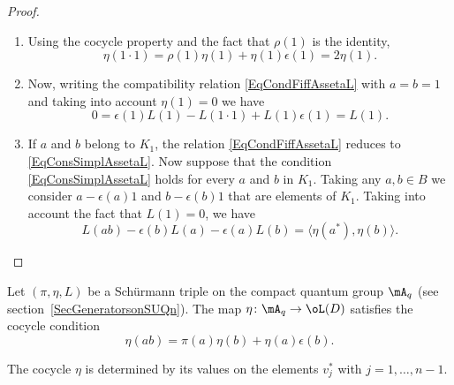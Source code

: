 \begin{proof}
    \begin{enumerate}
        \item
            Using the cocycle property and the fact that $\rho(1)$ is the identity,
            \begin{equation}
                \eta(1\cdot 1)=\rho(1)\eta(1)+\eta(1)\epsilon(1)=2\eta(1).
            \end{equation}
        \item
            Now, writing the compatibility relation \eqref{EqCondFiffAssetaL} with $a=b=1$ and taking into account $\eta(1)=0$ we have
            \begin{equation}
                0=\epsilon(1)L(1)-L(1\cdot 1)+L(1)\epsilon(1)=L(1).
            \end{equation}
        \item
            If $a$ and $b$ belong to $K_1$, the relation \eqref{EqCondFiffAssetaL} reduces to \eqref{EqConsSimplAssetaL}. Now suppose that the condition \eqref{EqConsSimplAssetaL} holds for every $a$ and $b$ in $K_1$. Taking any $a,b\in B$ we consider $a-\epsilon(a)1$ and $b-\epsilon(b)1$ that are elements of $K_1$. Taking into account the fact that $L(1)=0$, we have
            \begin{equation}
                L(ab)-\epsilon(b)L(a)-\epsilon(a)L(b)=\langle \eta(a^*), \eta(b)\rangle .
            \end{equation}
    \end{enumerate}
\end{proof}


Let $(\pi,\eta,L)$ be a Schürmann triple on the compact quantum group $\mA_q$ (see section~\ref{SecGeneratorsonSUQn}). The map $\eta\colon \mA_q\to \oL(D) $ satisfies the cocycle condition
\begin{equation}
    \eta(ab)=\pi(a)\eta(b)+\eta(a)\epsilon(b).
\end{equation}

\begin{proposition}     \label{PropCocycleDeteretavjnmu}
    The cocycle $\eta$ is determined by its values on the elements $v_j^*$ with $j=1,\ldots,n-1$.
\end{proposition}

